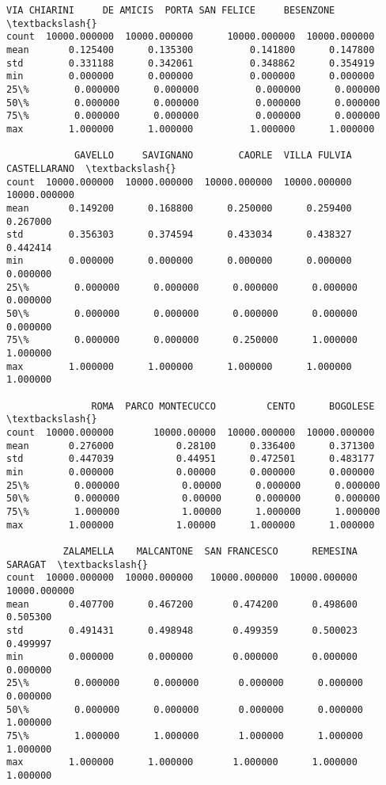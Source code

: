 \documentclass[11pt]{article}
\begin{document}
\begin{tcolorbox}[breakable, size=fbox, boxrule=.5pt, pad at break*=1mm, opacityfill=0]
\begin{Verbatim}[commandchars=\\\{\}]
       VIA CHIARINI     DE AMICIS  PORTA SAN FELICE     BESENZONE  \textbackslash{}
count  10000.000000  10000.000000      10000.000000  10000.000000
mean       0.125400      0.135300          0.141800      0.147800
std        0.331188      0.342061          0.348862      0.354919
min        0.000000      0.000000          0.000000      0.000000
25\%        0.000000      0.000000          0.000000      0.000000
50\%        0.000000      0.000000          0.000000      0.000000
75\%        0.000000      0.000000          0.000000      0.000000
max        1.000000      1.000000          1.000000      1.000000

            GAVELLO     SAVIGNANO        CAORLE  VILLA FULVIA  CASTELLARANO  \textbackslash{}
count  10000.000000  10000.000000  10000.000000  10000.000000  10000.000000
mean       0.149200      0.168800      0.250000      0.259400      0.267000
std        0.356303      0.374594      0.433034      0.438327      0.442414
min        0.000000      0.000000      0.000000      0.000000      0.000000
25\%        0.000000      0.000000      0.000000      0.000000      0.000000
50\%        0.000000      0.000000      0.000000      0.000000      0.000000
75\%        0.000000      0.000000      0.250000      1.000000      1.000000
max        1.000000      1.000000      1.000000      1.000000      1.000000

               ROMA  PARCO MONTECUCCO         CENTO      BOGOLESE  \textbackslash{}
count  10000.000000       10000.00000  10000.000000  10000.000000
mean       0.276000           0.28100      0.336400      0.371300
std        0.447039           0.44951      0.472501      0.483177
min        0.000000           0.00000      0.000000      0.000000
25\%        0.000000           0.00000      0.000000      0.000000
50\%        0.000000           0.00000      0.000000      0.000000
75\%        1.000000           1.00000      1.000000      1.000000
max        1.000000           1.00000      1.000000      1.000000

          ZALAMELLA    MALCANTONE  SAN FRANCESCO      REMESINA       SARAGAT  \textbackslash{}
count  10000.000000  10000.000000   10000.000000  10000.000000  10000.000000
mean       0.407700      0.467200       0.474200      0.498600      0.505300
std        0.491431      0.498948       0.499359      0.500023      0.499997
min        0.000000      0.000000       0.000000      0.000000      0.000000
25\%        0.000000      0.000000       0.000000      0.000000      0.000000
50\%        0.000000      0.000000       0.000000      0.000000      1.000000
75\%        1.000000      1.000000       1.000000      1.000000      1.000000
max        1.000000      1.000000       1.000000      1.000000      1.000000


\end{Verbatim}
\end{tcolorbox}
\end{document}
